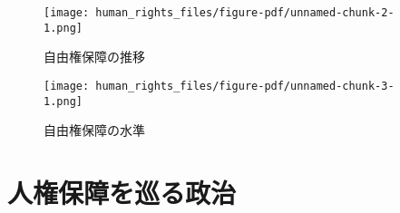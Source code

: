 \documentclass[
  xelatex,
  ja=standard]{bxjsarticle}
\begin{document}
\begin{figure}[htpb]

{\centering \texttt{[image: human\_rights\_files/figure-pdf/unnamed-chunk-2-1.png]}

}

\caption{自由権保障の推移}

\end{figure}

\begin{figure}[htpb]

{\centering \texttt{[image: human\_rights\_files/figure-pdf/unnamed-chunk-3-1.png]}

}

\caption{自由権保障の水準}

\end{figure}

\hypertarget{ux4ebaux6a29ux4fddux969cux3092ux5de1ux308bux653fux6cbb}{%
\section{人権保障を巡る政治}\label{ux4ebaux6a29ux4fddux969cux3092ux5de1ux308bux653fux6cbb}}


\renewcommand\refname{戦争と人権}
  
\end{document}
